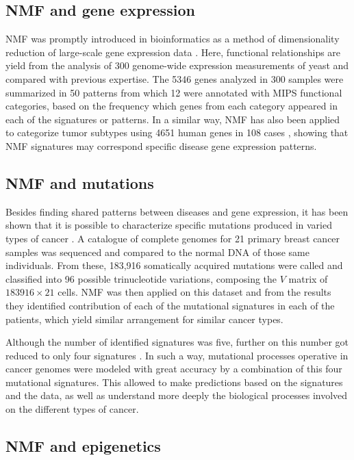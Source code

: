 \subsection{NMF and gene expression}

NMF was promptly introduced in bioinformatics as a method of dimensionality reduction of large-scale gene expression data \cite{Kim2003}. Here, functional relationships are yield from the analysis of 300 genome-wide expression measurements of yeast and compared with previous expertise. The 5346 genes analyzed in 300 samples were summarized in 50 patterns from which 12 were annotated with MIPS \cite{Mewes2002} functional categories, based on the frequency which genes from each category appeared in each of the signatures or patterns. In a similar way, NMF has also been applied to categorize tumor subtypes using 4651 human genes in 108 cases \cite{Frigyesi2008}, showing that NMF signatures may correspond specific disease gene expression patterns.

\subsection{NMF and mutations}

Besides finding shared patterns between diseases and gene expression, it has been shown that it is possible to characterize specific mutations produced in varied types of cancer \cite{Ramakrishna2012}. A catalogue of complete genomes for 21 primary breast cancer samples was sequenced and compared to the normal DNA of those same individuals. From these, 183,916 somatically acquired mutations were called and classified into 96 possible trinucleotide variations, composing the \(V\) matrix of \(183916 \times 21\) cells. NMF was then applied on this dataset and from the results they identified contribution of each of the mutational signatures in each of the patients, which yield similar arrangement for similar cancer types.

\medskip

Although the number of identified signatures was five, further on this number got reduced to only four signatures \cite{Alexandrov2013}. In such a way, mutational processes operative in cancer genomes were modeled with great accuracy by a combination of this four mutational signatures. This allowed to make predictions based on the signatures and the data, as well as understand more deeply the biological processes involved on the different types of cancer.

\subsection{NMF and epigenetics}

